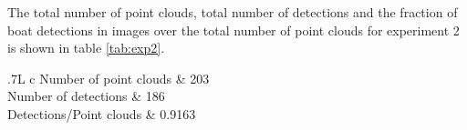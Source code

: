 The total number of point clouds, total number of detections and the fraction of boat detections in images over the total number of point clouds for experiment 2 is shown in table \ref{tab:exp2}.
\begin{table}[H]
	\centering
	\begin{tabularx}{.7\linewidth}{L c}
		\toprule
		Number of point clouds & 203\\
		\midrule
		Number of detections & 186\\
		\midrule
		Detections/Point clouds & 0.9163 \\
		\bottomrule
	\end{tabularx}
	\caption{Data from experiment 2.}
	\label{tab:exp2}
\end{table}
